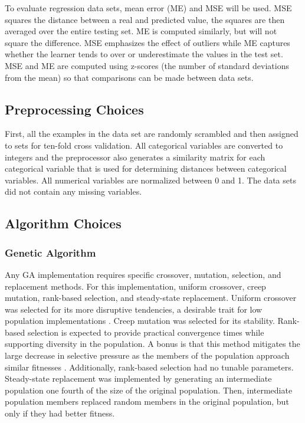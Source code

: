 \documentclass[twoside,11pt]{article}
\begin{document}
	To evaluate regression data sets, mean error (ME) and MSE will be used. MSE squares the distance between a real and predicted value, the squares are then averaged over the entire testing set.
	ME is computed similarly, but will not square the difference. MSE emphasizes the effect of outliers while ME captures whether the learner tends to over or underestimate the values in the test set.
	MSE and ME are computed using z-scores (the number of standard deviations from the mean) so that comparisons can be made between data sets.

\subsection{Preprocessing Choices}

	First, all the examples in the data set are randomly scrambled and then assigned to sets for ten-fold cross validation.
	All categorical variables are converted to integers
	and the preprocessor also generates a similarity matrix for each categorical variable that is used for determining distances between categorical variables.
	All numerical variables are normalized between 0 and 1.
	The data sets did not contain any missing variables.

\subsection{Algorithm Choices}

\subsubsection{Genetic Algorithm}

	Any GA implementation requires specific crossover, mutation, selection, and replacement methods. For this implementation, uniform crossover, creep mutation, rank-based selection, and steady-state replacement. Uniform crossover was selected for its more disruptive tendencies, a desirable trait for low population implementations \citep{ga_tutorial}. Creep mutation was selected for its stability. Rank-based selection is expected to provide practical convergence times while supporting diversity in the population. A bonus is that this method mitigates the large decrease in selective pressure as the members of the population approach similar fitnesses \citep{ga_tutorial}. Additionally, rank-based selection had no tunable parameters. Steady-state replacement was implemented by generating an intermediate population one fourth of the size of the original population. Then, intermediate population members replaced random members in the original population, but only if they had better fitness.
\end{document}

